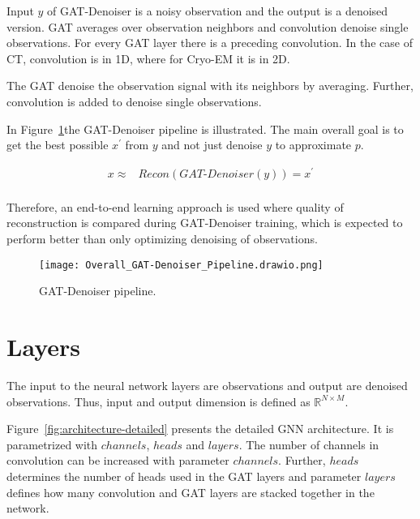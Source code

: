 
Input $y$ of GAT-Denoiser is a noisy observation and the output is a denoised version.
GAT averages over observation neighbors and convolution denoise single observations. 
For every GAT layer there is a preceding convolution. 
In the case of CT, convolution is in 1D, where for Cryo-EM it is in 2D.

\begin{tcolorbox}[colback=red!5!white,colframe=red!75!black]
  The GAT denoise the observation signal with its neighbors by averaging. 
  Further, convolution is added to denoise single observations.
\end{tcolorbox}

In Figure~\ref{fig:overall-concept}the GAT-Denoiser pipeline is illustrated.
The main overall goal is to get the best possible $x^{\prime}$ 
from $y$ and not just denoise $y$ to approximate $p$.


\begin{equation}
  \begin{aligned}
    x \approx   &\textit{Recon} \left( \textit{GAT-Denoiser} \left( y \right) \right) = x^{\prime} \\
  \end{aligned}
\end{equation}

Therefore, an end-to-end learning approach is used where quality of reconstruction is 
compared during GAT-Denoiser training, which is expected to perform better than 
only optimizing denoising of observations.

\begin{figure}[H]
  \centering
  \texttt{[image: Overall\_GAT-Denoiser\_Pipeline.drawio.png]}
  \caption{GAT-Denoiser pipeline.}
  \label{fig:overall-concept}
\end{figure}


\section{Layers}
The input to the neural network layers are observations and output are denoised observations.
Thus, input and output dimension is defined as  $\mathbb{R}^{N \times M}$. 

Figure~\ref{fig:architecture-detailed} presents the detailed GNN architecture.
It is parametrized with $channels$, $heads$ and $layers$. 
The number of channels in convolution can be increased with parameter $channels$.
Further, $heads$ determines the number of heads used in the GAT layers and parameter 
$layers$ defines how many convolution and GAT layers are stacked together in the network.

